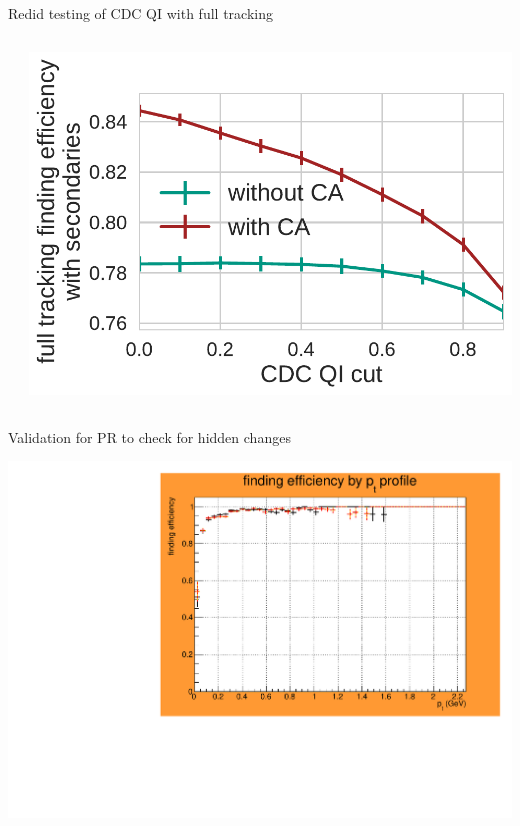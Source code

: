 \documentclass[presentation]{etp-beamer-fancy}
\begin{document}
\begin{frame}[label={sec:org652d49d}]{Redid testing of CDC QI with full tracking}
\begin{columns}
\begin{column}{0.33\columnwidth}
\begin{center}
\end{center}
\end{column}
\begin{column}{0.33\columnwidth}
\begin{center}
\includegraphics[width=\textwidth]{./figures/full-finding-efficiency-secondaries-by-cdc-qi-cut.pdf}
\end{center}
\end{column}
\end{columns}
\end{frame}

\begin{frame}[label={sec:org7261e34}]{Validation for PR to check for hidden changes}
\begin{center}
\includegraphics[width=\textwidth]{./figures/FullTrackingValidation_Full_finding_efficiency_by_p_t.pdf}
\end{center}
\end{frame}
\end{document}

